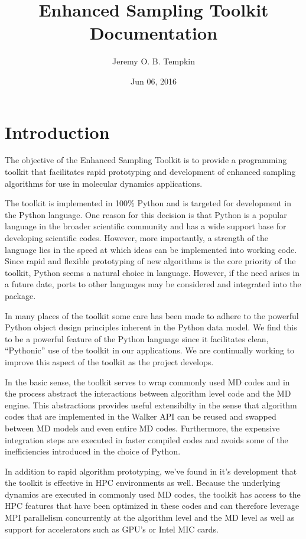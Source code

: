 \documentclass[letterpaper,10pt,english]{sphinxmanual}
\title{Enhanced Sampling Toolkit Documentation}
\date{Jun 06, 2016}
\author{Jeremy O. B. Tempkin}
\begin{document}
\maketitle
\tableofcontents
{}\label{index::doc}



\chapter{Introduction}
\label{intro.doc:introduction}\label{intro.doc:welcome-to-enhanced-sampling-toolkit-s-documentation}\label{intro.doc::doc}
The objective of the Enhanced Sampling Toolkit is to provide a programming toolkit that facilitates rapid prototyping and development of enhanced sampling algorithms for use in molecular dynamics applications.

The toolkit is implemented in 100\% Python and is targeted for development in the Python language. One reason for this decision is that Python is a popular language in the broader scientific community and has a wide support base for developing scientific codes. However, more importantly, a strength of the language lies in the speed at which ideas can be implemented into working code. Since rapid and flexible prototyping of new algorithms is the core priority of the toolkit, Python seems a natural choice in language. However, if the need arises in a future date, ports to other languages may be considered and integrated into the package.

In many places of the toolkit some care has been made to adhere to the powerful Python object design principles inherent in the Python data model. We find this to be a powerful feature of the Python language since it facilitates clean, ``Pythonic'' use of the toolkit in our applications. We are continually working to improve this aspect of the toolkit as the project develops.

In the basic sense, the toolkit serves to wrap commonly used MD codes and in the process abstract the interactions between algorithm level code and the MD engine. This abstractions provides useful extensibilty in the sense that algorithm codes that are implemented in the Walker API can be reused and swapped between MD models and even entire MD codes. Furthermore, the expensive integration steps are executed in faster compiled codes and avoids some of the inefficiencies introduced in the choice of Python.

In addition to rapid algorithm prototyping, we've found in it's development that the toolkit is effective in HPC environments as well. Because the underlying dynamics are executed in commonly used MD codes, the toolkit has access to the HPC features that have been optimized in these codes and can therefore leverage MPI parallelism concurrently at the algorithm level and the MD level as well as support for accelerators such as GPU's or Intel MIC cards.
\end{document}
